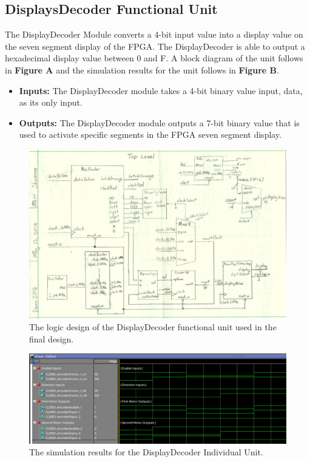 \documentclass[a4paper]{article}
\begin{document}
\subsection{DisplaysDecoder Functional Unit}
The DisplayDecoder Module converts a 4-bit input value into a display value on the seven segment display of the FPGA. The DisplayDecoder is
able to output a hexadecimal display value between 0 and F. A block diagram of the unit follows in \textbf{Figure A} and the simulation results for the unit follows in \textbf{Figure B}.
\begin{itemize}
  \item \textbf{Inputs:  } The DisplayDecoder module takes a 4-bit binary value input, data, as its only input.
  \item \textbf{Outputs: } The DisplayDecoder module outputs a 7-bit binary value that is used to activate specific segments in the FPGA seven segment display.
\end{itemize}
\begin{figure}[h]
  \centering
    \includegraphics[width=.8\textwidth]{images/functional_1.png}
	\caption{The logic design of the DisplayDecoder functional unit used in the final design.}
    \label{fig:functional-1}
\end{figure}
\begin{figure}[h]
  \centering
    \includegraphics[width=.98\textwidth]{sims/functional_1.png}
	\caption{The simulation results for the DisplayDecoder Individual Unit.}
    \label{fig:top-level-sim}
\end{figure}
\end{document}
